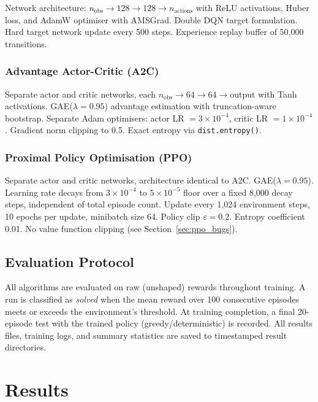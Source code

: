 \documentclass[a4paper,12pt]{article}
\begin{document}
Network architecture: $n_{\text{obs}} \to 128 \to 128 \to n_{\text{actions}}$ with ReLU activations, Huber loss, and AdamW optimiser with AMSGrad. Double DQN target formulation. Hard target network update every 500 steps. Experience replay buffer of 50,000 transitions.

\subsubsection{Advantage Actor-Critic (A2C)}

Separate actor and critic networks, each $n_{\text{obs}} \to 64 \to 64 \to \text{output}$ with Tanh activations. GAE($\lambda=0.95$) advantage estimation with truncation-aware bootstrap. Separate Adam optimisers: actor LR $= 3\times10^{-4}$, critic LR $= 1\times10^{-4}$. Gradient norm clipping to 0.5. Exact entropy via \texttt{dist.entropy()}.

\subsubsection{Proximal Policy Optimisation (PPO)}

Separate actor and critic networks, architecture identical to A2C. GAE($\lambda=0.95$). Learning rate decays from $3\times10^{-4}$ to $5\times10^{-5}$ floor over a fixed 8,000 decay steps, independent of total episode count. Update every 1,024 environment steps, 10 epochs per update, minibatch size 64. Policy clip $\varepsilon=0.2$. Entropy coefficient 0.01. No value function clipping (see Section~\ref{sec:ppo_bugs}).

\subsection{Evaluation Protocol}

All algorithms are evaluated on raw (unshaped) rewards throughout training. A run is classified as \textit{solved} when the mean reward over 100 consecutive episodes meets or exceeds the environment's threshold. At training completion, a final 20-episode test with the trained policy (greedy/deterministic) is recorded. All results files, training logs, and summary statistics are saved to timestamped result directories.

\section{Results}
\label{sec:results}
\end{document}
